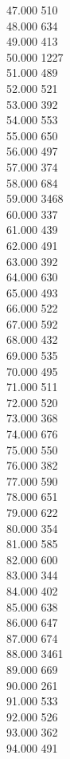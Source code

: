 { 47.000	510 \\
 48.000	634 \\
 49.000	413 \\
 50.000	1227 \\
 51.000	489 \\
 52.000	521 \\
 53.000	392 \\
 54.000	553 \\
 55.000	650 \\
 56.000	497 \\
 57.000	374 \\
 58.000	684 \\
 59.000	3468 \\
 60.000	337 \\
 61.000	439 \\
 62.000	491 \\
 63.000	392 \\
 64.000	630 \\
 65.000	493 \\
 66.000	522 \\
 67.000	592 \\
 68.000	432 \\
 69.000	535 \\
 70.000	495 \\
 71.000	511 \\
 72.000	520 \\
 73.000	368 \\
 74.000	676 \\
 75.000	550 \\
 76.000	382 \\
 77.000	590 \\
 78.000	651 \\
 79.000	622 \\
 80.000	354 \\
 81.000	585 \\
 82.000	600 \\
 83.000	344 \\
 84.000	402 \\
 85.000	638 \\
 86.000	647 \\
 87.000	674 \\
 88.000	3461 \\
 89.000	669 \\
 90.000	261 \\
 91.000	533 \\
 92.000	526 \\
 93.000	362 \\
 94.000	491 \\
}
